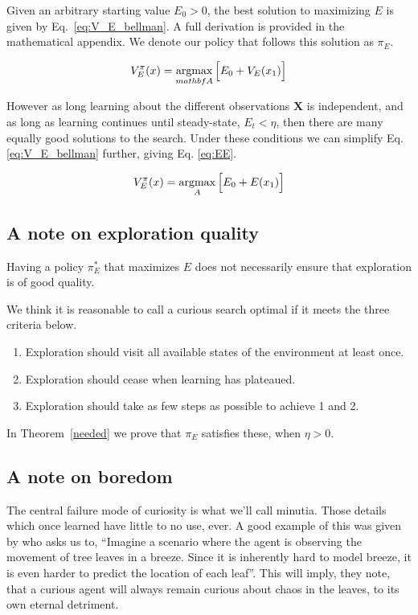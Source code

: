 Given an arbitrary starting value $E_0 > 0$, the best solution to maximizing $E$ is given by Eq.~\ref{eq:V_E_bellman}. A full derivation is provided in the mathematical appendix. We denote our policy that follows this solution as $\pi_E$.

\begin{equation}
	\label{eq:V_E_bellman} 
	V^{\pi}_E(x) = \operatorname*{argmax}_{mathbf{A}} \Big [ E_0 + V_E(x_1) \Big ]
\end{equation}

However as long learning about the different observations $\mathbf{X}$ is independent, and as long as learning continues until steady-state, $E_t < \eta$, then there are many equally good solutions to the search. Under these conditions we can simplify Eq. \ref{eq:V_E_bellman} further, giving Eq. \ref{eq:EE}. 

\begin{equation}
	\label{eq:EE} 
	V^{\pi}_E(x) = \operatorname*{argmax}_A \Big [ E_0 + E(x_1) \Big ]
\end{equation}

\subsection{A note on exploration quality}

Having a policy $\pi_E^*$ that maximizes $E$ does not necessarily ensure that exploration is of good quality.



We think it is reasonable to call a curious search optimal if it meets the three criteria below. 

\begin{enumerate}
	\item Exploration should visit all available states of the environment at least once.
	\item Exploration should cease when learning has plateaued.
	\item Exploration should take as few steps as possible to achieve 1 and 2.
\end{enumerate}

In Theorem~\ref{needed} we prove that $\pi_E$ satisfies these, when $\eta > 0$.


\subsection{A note on boredom}
The central failure mode of curiosity is what we'll call minutia. Those details which once learned have little to no use, ever. A good example of this was given by \cite{Pathak2017} who asks us to, ``Imagine a scenario where the agent is observing the movement of tree leaves in a breeze. Since it is inherently hard to model breeze, it is even harder to predict the location of each leaf''. This will imply, they note, that a curious agent will always remain curious about chaos in the leaves, to its own eternal detriment. 

